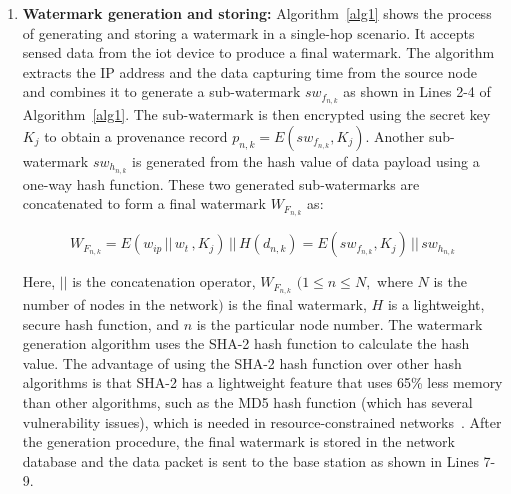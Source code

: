 \documentclass{llncs}
\begin{document}
\begin{enumerate}
\setlength{\itemsep}{10pt}

    \item \textbf{Watermark generation and storing:} Algorithm~\ref{alg1} shows the process of generating and storing a watermark in a single-hop scenario. It accepts sensed data from the \gls*{iot} device to produce a final watermark. The algorithm extracts the IP address and the data capturing time from the source node and combines it to generate a sub-watermark $sw_{f_{n,k}}$ as shown in Lines 2-4 of Algorithm~\ref{alg1}. The sub-watermark is then encrypted using the secret key $K_j$ to obtain a provenance record $p_{n,k} = E(sw_{f_{n,k}},K_j)$. Another sub-watermark $sw_{h_{n,k}}$ is generated from the hash value of data payload using a one-way hash function. These two generated sub-watermarks are concatenated to form a final watermark $W_{F_{n,k}}$ as:
    
    \begin{equation} \label{eq:1}
    W_{F_{n,k}} = E(w_{ip} \, || \, w_{t} \,,K_j) \, || \, H(d_{n,k})
    = E(sw_{f_{n,k}},K_j) \, || \, sw_{h_{n,k}}
    \end{equation}
    
    Here, $||$ is the concatenation operator, $W_{F_{n,k}}$ $( 1 \leq n \leq N,$ where $N$ is the number of nodes in the network$)$ is the final watermark, $H$ is a lightweight, secure hash function, and $n$ is the particular node number. The watermark generation algorithm uses the SHA-2 hash function to calculate the hash value. The advantage of using the SHA-2 hash function over other hash algorithms is that SHA-2 has a lightweight feature that uses 65\% less memory than other algorithms, such as the MD5 hash function (which has several vulnerability issues), which is needed in resource-constrained networks~\cite{Ganesan2003}. After the generation procedure, the final watermark is stored in the network database and the data packet is sent to the base station as shown in Lines 7-9. 
    

\end{enumerate}
\end{document}
